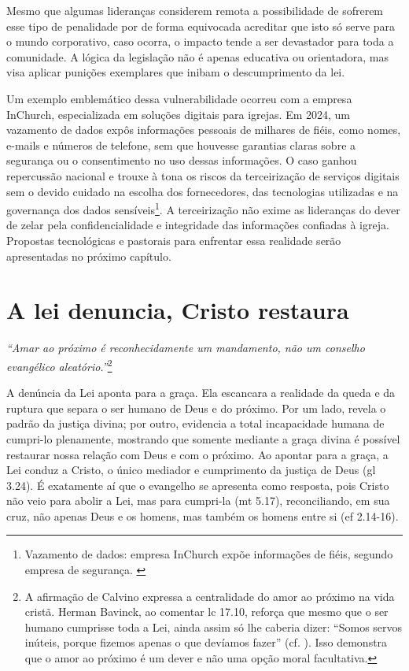 Mesmo que algumas lideranças considerem remota a possibilidade de sofrerem esse tipo de penalidade por de forma equivocada acreditar que isto só serve para o mundo corporativo, caso ocorra, o impacto tende a ser devastador para toda a comunidade. A lógica da legislação não é apenas educativa ou orientadora, mas visa aplicar punições exemplares que inibam o descumprimento da lei.

Um exemplo emblemático dessa vulnerabilidade ocorreu com a empresa InChurch, especializada em soluções digitais para igrejas. Em 2024, um vazamento de dados expôs informações pessoais de milhares de fiéis, como nomes, e-mails e números de telefone, sem que houvesse garantias claras sobre a segurança ou o consentimento no uso dessas informações. O caso ganhou repercussão nacional e trouxe à tona os riscos da terceirização de serviços digitais sem o devido cuidado na escolha dos fornecedores, das tecnologias utilizadas e na governança dos dados sensíveis\footnote{Vazamento de dados: empresa InChurch expõe informações de fiéis, segundo empresa de segurança. \cite{almeida_inchurch_2024}}. A terceirização não exime as lideranças do dever de zelar pela confidencialidade e integridade das informações confiadas à igreja. Propostas tecnológicas e pastorais para enfrentar essa realidade serão apresentadas no próximo capítulo.

\section{A lei denuncia, Cristo restaura}

\textit{``Amar ao próximo é reconhecidamente um mandamento, não um conselho evangélico aleatório.''}\footnote{A afirmação de Calvino expressa a centralidade do amor ao próximo na vida cristã. Herman Bavinck, ao comentar \gls{lc} 17.10, reforça que mesmo que o ser humano cumprisse toda a Lei, ainda assim só lhe caberia dizer: ``Somos servos inúteis, porque fizemos apenas o que devíamos fazer'' (cf. \cite[p.~738]{bavinck2012}). Isso demonstra que o amor ao próximo é um dever e não uma opção moral facultativa.} \cite[p.~745]{calvino2022}

A denúncia da Lei aponta para a graça. Ela escancara a realidade da queda e da ruptura que separa o ser humano de Deus e do próximo. Por um lado, revela o padrão da justiça divina; por outro, evidencia a total incapacidade humana de cumpri-lo plenamente, mostrando que somente mediante a graça divina é possível restaurar nossa relação com Deus e com o próximo. Ao apontar para a graça, a Lei conduz a Cristo, o único mediador e cumprimento da justiça de Deus (\gls{gl} 3.24). É exatamente aí que o evangelho se apresenta como resposta, pois Cristo não veio para abolir a Lei, mas para cumpri-la (\gls{mt} 5.17), reconciliando, em sua cruz, não apenas Deus e os homens, mas também os homens entre si (\gls{ef} 2.14-16).

